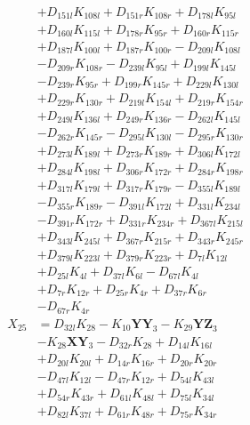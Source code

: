 \begin{multicols}{2}
\begin{align}
&+ D_{151l}K_{108l} + D_{151r}K_{108r} + D_{178l}K_{95l}  \nonumber \\
&+ D_{160l}K_{115l} + D_{178r}K_{95r} + D_{160r}K_{115r}  \nonumber \\
&+ D_{187l}K_{100l} + D_{187r}K_{100r} - D_{209l}K_{108l}  \nonumber \\
&- D_{209r}K_{108r} - D_{239l}K_{95l} + D_{199l}K_{145l}  \nonumber \\
&- D_{239r}K_{95r} + D_{199r}K_{145r} + D_{229l}K_{130l}  \nonumber \\
&+ D_{229r}K_{130r} + D_{219l}K_{154l} + D_{219r}K_{154r}  \nonumber \\
&+ D_{249l}K_{136l} + D_{249r}K_{136r} - D_{262l}K_{145l}  \nonumber \\
&- D_{262r}K_{145r} - D_{295l}K_{130l} - D_{295r}K_{130r}  \nonumber \\
&+ D_{273l}K_{189l} + D_{273r}K_{189r} + D_{306l}K_{172l}  \nonumber \\
&+ D_{284l}K_{198l} + D_{306r}K_{172r} + D_{284r}K_{198r}  \nonumber \\
&+ D_{317l}K_{179l} + D_{317r}K_{179r} - D_{355l}K_{189l}  \nonumber \\
&- D_{355r}K_{189r} - D_{391l}K_{172l} + D_{331l}K_{234l}  \nonumber \\
&- D_{391r}K_{172r} + D_{331r}K_{234r} + D_{367l}K_{215l}  \nonumber \\
&+ D_{343l}K_{245l} + D_{367r}K_{215r} + D_{343r}K_{245r}  \nonumber \\
&+ D_{379l}K_{223l} + D_{379r}K_{223r} + D_{7l}K_{12l}  \nonumber \\
&+ D_{25l}K_{4l} + D_{37l}K_{6l} - D_{67l}K_{4l}  \nonumber \\
&+ D_{7r}K_{12r} + D_{25r}K_{4r} + D_{37r}K_{6r}  \nonumber \\
&- D_{67r}K_{4r} \nonumber \\
X_{25} &= D_{32l}K_{28} - K_{10}\mathbf{YY}_3 - K_{29}\mathbf{YZ}_3  \nonumber \\
&- K_{28}\mathbf{XY}_3 - D_{32r}K_{28} + D_{14l}K_{16l}  \nonumber \\
&+ D_{20l}K_{20l} + D_{14r}K_{16r} + D_{20r}K_{20r}  \nonumber \\
&- D_{47l}K_{12l} - D_{47r}K_{12r} + D_{54l}K_{43l}  \nonumber \\
&+ D_{54r}K_{43r} + D_{61l}K_{48l} + D_{75l}K_{34l}  \nonumber \\
&+ D_{82l}K_{37l} + D_{61r}K_{48r} + D_{75r}K_{34r}  \nonumber \\

\end{align}
\end{multicols}
